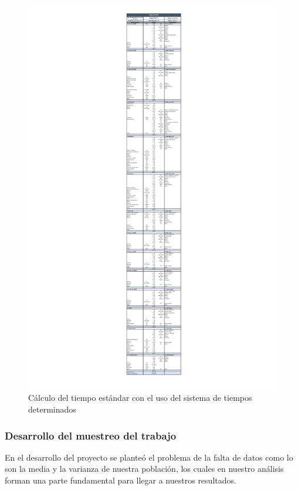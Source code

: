     \begin{figure}[H]
        \centering
        \includegraphics[trim = {100mm 1mm 100mm 10mm},clip,scale=0.41]{22/Img/diagramaMTM.pdf}
        \caption{Cálculo del tiempo estándar con el uso del sistema de tiempos determinados}
        \label{fig:STP}
    \end{figure}
    
    
    
    
    
    \subsubsection{Desarrollo del muestreo del trabajo}
    En el desarrollo del proyecto se planteó el problema de la falta de datos como lo son la media y la varianza de nuestra población, los cuales en nuestro análisis forman una parte fundamental para llegar a nuestros resultados. 
    

